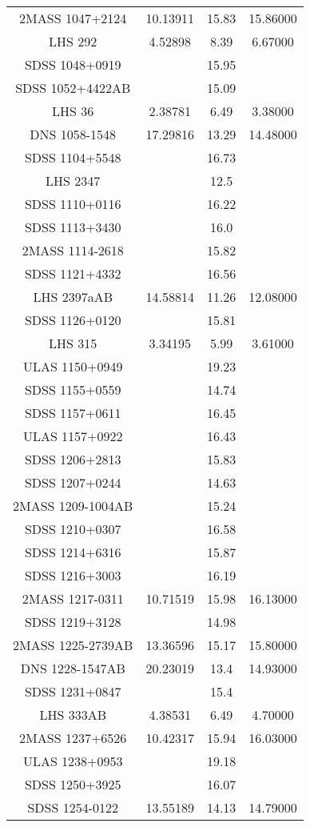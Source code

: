 \begin{table}
\begin{tabular}{cccc}
2MASS 1047+2124 & 10.13911 & 15.83 & 15.86000 \\
LHS 292 & 4.52898 & 8.39 & 6.67000 \\
SDSS 1048+0919 &  & 15.95 &  \\
SDSS 1052+4422AB &  & 15.09 &  \\
LHS 36 & 2.38781 & 6.49 & 3.38000 \\
DNS 1058-1548 & 17.29816 & 13.29 & 14.48000 \\
SDSS 1104+5548 &  & 16.73 &  \\
LHS 2347 &  & 12.5 &  \\
SDSS 1110+0116 &  & 16.22 &  \\
SDSS 1113+3430 &  & 16.0 &  \\
2MASS 1114-2618 &  & 15.82 &  \\
SDSS 1121+4332 &  & 16.56 &  \\
LHS 2397aAB & 14.58814 & 11.26 & 12.08000 \\
SDSS 1126+0120 &  & 15.81 &  \\
LHS 315 & 3.34195 & 5.99 & 3.61000 \\
ULAS 1150+0949 &  & 19.23 &  \\
SDSS 1155+0559 &  & 14.74 &  \\
SDSS 1157+0611 &  & 16.45 &  \\
ULAS 1157+0922 &  & 16.43 &  \\
SDSS 1206+2813 &  & 15.83 &  \\
SDSS 1207+0244 &  & 14.63 &  \\
2MASS 1209-1004AB &  & 15.24 &  \\
SDSS 1210+0307 &  & 16.58 &  \\
SDSS 1214+6316 &  & 15.87 &  \\
SDSS 1216+3003 &  & 16.19 &  \\
2MASS 1217-0311 & 10.71519 & 15.98 & 16.13000 \\
SDSS 1219+3128 &  & 14.98 &  \\
2MASS 1225-2739AB & 13.36596 & 15.17 & 15.80000 \\
DNS 1228-1547AB & 20.23019 & 13.4 & 14.93000 \\
SDSS 1231+0847 &  & 15.4 &  \\
LHS 333AB & 4.38531 & 6.49 & 4.70000 \\
2MASS 1237+6526 & 10.42317 & 15.94 & 16.03000 \\
ULAS 1238+0953 &  & 19.18 &  \\
SDSS 1250+3925 &  & 16.07 &  \\
SDSS 1254-0122 & 13.55189 & 14.13 & 14.79000 \\

\end{tabular}
\end{table}
